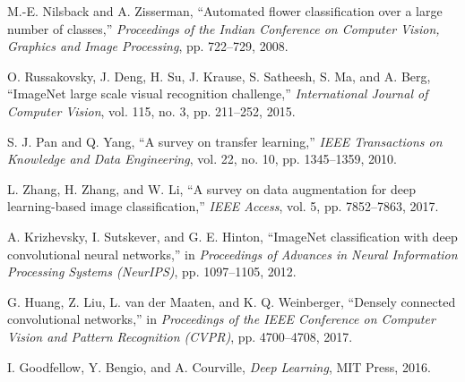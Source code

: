 \begin{thebibliography}{99}

 M.-E. Nilsback and A. Zisserman, ``Automated flower classification over a large number of classes,'' \textit{Proceedings of the Indian Conference on Computer Vision, Graphics and Image Processing}, pp. 722–729, 2008.

 O. Russakovsky, J. Deng, H. Su, J. Krause, S. Satheesh, S. Ma, and A. Berg, ``ImageNet large scale visual recognition challenge,'' \textit{International Journal of Computer Vision}, vol. 115, no. 3, pp. 211–252, 2015.

 S. J. Pan and Q. Yang, ``A survey on transfer learning,'' \textit{IEEE Transactions on Knowledge and Data Engineering}, vol. 22, no. 10, pp. 1345–1359, 2010.

 L. Zhang, H. Zhang, and W. Li, ``A survey on data augmentation for deep learning-based image classification,'' \textit{IEEE Access}, vol. 5, pp. 7852–7863, 2017.

 A. Krizhevsky, I. Sutskever, and G. E. Hinton, ``ImageNet classification with deep convolutional neural networks,'' in \textit{Proceedings of Advances in Neural Information Processing Systems (NeurIPS)}, pp. 1097–1105, 2012.

 G. Huang, Z. Liu, L. van der Maaten, and K. Q. Weinberger, ``Densely connected convolutional networks,'' in \textit{Proceedings of the IEEE Conference on Computer Vision and Pattern Recognition (CVPR)}, pp. 4700–4708, 2017.

 I. Goodfellow, Y. Bengio, and A. Courville, \textit{Deep Learning}, MIT Press, 2016.

\end{thebibliography}























